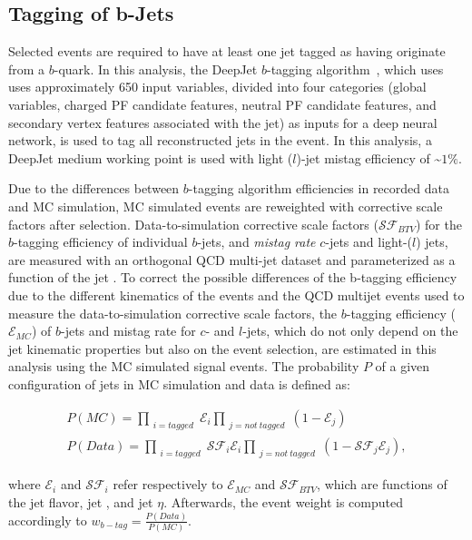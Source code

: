 \subsection{Tagging of b-Jets}
Selected events are required to have at least one jet tagged as having originate from a $b$-quark.
In this analysis, the DeepJet $b$-tagging algorithm~\cite{bib:Bols_2020}, which uses uses approximately 650 input variables, divided into four categories (global variables, charged PF candidate features, neutral PF candidate features, and secondary vertex features associated with the jet) as inputs for a deep neural network, is used to tag all reconstructed jets in the event.
In this analysis, a DeepJet medium working point is used with light ($l$)-jet mistag efficiency of \sim$1\%$.

Due to the differences between $b$-tagging algorithm efficiencies in recorded data and MC simulation, MC simulated events are reweighted with corrective scale factors after selection.
Data-to-simulation corrective scale factors ($\mathcal{SF}_{BTV}$) for the $b$-tagging efficiency of individual $b$-jets, and \textit{mistag rate} $c$-jets and light-($l$) jets, are measured with an orthogonal QCD multi-jet dataset and parameterized as a function of the jet \pT.
To correct the possible differences of the b-tagging efficiency due to the different kinematics of the \ttbar events and the QCD multijet events used to measure the data-to-simulation corrective scale factors, the $b$-tagging efficiency ($\mathcal{E}_{MC}$) of $b$-jets and mistag rate for $c$- and $l$-jets, which do not only depend on the jet kinematic properties but also on the event selection, are estimated in this analysis using the MC simulated \ttbar signal events.
The probability $P$ of a given configuration of jets in MC simulation and data is defined as:
\begin{linenomath*}
\begin{align}
P(MC) = \prod_{\substack{i=tagged}} \mathcal{E}_i \prod_{\substack{j=not~tagged}} (1 - \mathcal{E}_j) \\
P(Data) = \prod_{\substack{i=tagged}} \mathcal{SF}_i\mathcal{E}_i \prod_{\substack{j=not~tagged}} (1 - \mathcal{SF}_j\mathcal{E}_j),
\end{align}
\end{linenomath*}
where $\mathcal{E}_i$ and $ \mathcal{SF}_i $ refer respectively to $\mathcal{E}_{MC}$ and $\mathcal{SF}_{BTV}$, which are functions of the jet flavor, jet \pT, and jet $\eta$. 
Afterwards, the event weight is computed accordingly to $w_{b-tag} = \frac{P(Data)}{P(MC)}$.


